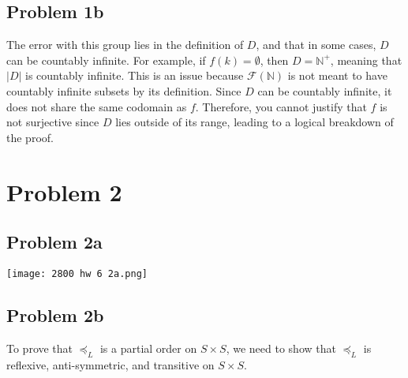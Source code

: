 \documentclass{article}
\begin{document}
\subsection{Problem 1b}

The error with this group lies in the definition of $D$, and that in some cases, $D$ can be countably infinite. For example, if $f(k) = \emptyset$, then $D = \mathbb{N}^+$, meaning that $|D|$ is countably infinite. This is an issue because $\mathcal{F}(\mathbb{N})$ is not meant to have countably infinite subsets by its definition. Since $D$ can be countably infinite, it does not share the same codomain as $f$. Therefore, you cannot justify that $f$ is not surjective since $D$ lies outside of its range, leading to a logical breakdown of the proof.

\section{Problem 2}

\subsection{Problem 2a}

\begin{center}

\texttt{[image: 2800 hw 6 2a.png]}

\end{center}

\subsection{Problem 2b}

To prove that $\preceq_{L}$ is a partial order on $S \times S$, we need to show that $\preceq_{L}$ is reflexive, anti-symmetric, and transitive on $S \times S$.
\end{document}
